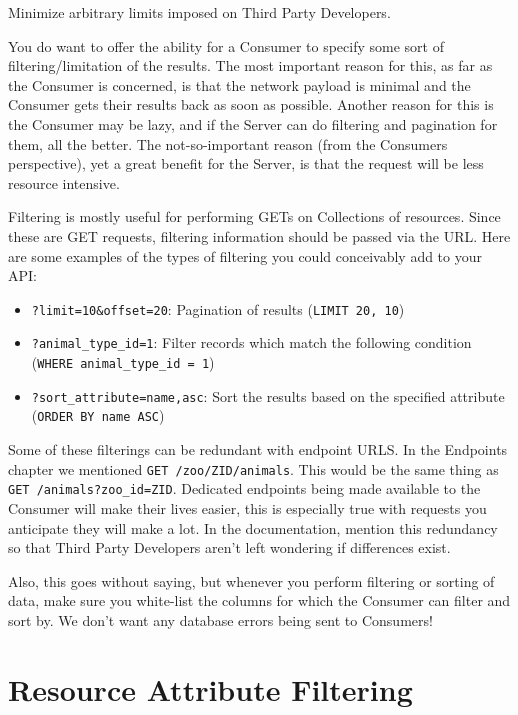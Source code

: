 \documentclass{book}
\begin{document}
Minimize arbitrary limits imposed on Third Party Developers.

You do want to offer the ability for a Consumer to specify some sort of filtering/limitation of the results. The most important reason for this, as far as the Consumer is concerned, is that the network payload is minimal and the Consumer gets their results back as soon as possible. Another reason for this is the Consumer may be lazy, and if the Server can do filtering and pagination for them, all the better. The not-so-important reason (from the Consumers perspective), yet a great benefit for the Server, is that the request will be less resource intensive.

Filtering is mostly useful for performing GETs on Collections of resources. Since these are GET requests, filtering information should be passed via the URL. Here are some examples of the types of filtering you could conceivably add to your API:

\begin{itemize}
\item \texttt{?limit=10\&offset=20}: Pagination of results (\texttt{LIMIT 20, 10})
\item \texttt{?animal\_type\_id=1}: Filter records which match the following condition (\texttt{WHERE animal\_type\_id = 1})
\item \texttt{?sort\_attribute=name,asc}: Sort the results based on the specified attribute (\texttt{ORDER BY name ASC})
\end{itemize}

Some of these filterings can be redundant with endpoint URLS. In the Endpoints chapter we mentioned \texttt{GET /zoo/ZID/animals}. This would be the same thing as \texttt{GET /animals?zoo\_id=ZID}. Dedicated endpoints being made available to the Consumer will make their lives easier, this is especially true with requests you anticipate they will make a lot. In the documentation, mention this redundancy so that Third Party Developers aren't left wondering if differences exist.

Also, this goes without saying, but whenever you perform filtering or sorting of data, make sure you white-list the columns for which the Consumer can filter and sort by. We don't want any database errors being sent to Consumers!


\section{Resource Attribute Filtering}
\end{document}
